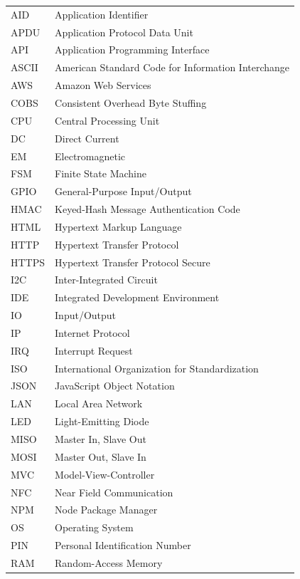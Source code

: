 \documentclass[12pt]{report}
\begin{document}
\begin{longtable}[t]{l@{\hspace*{2cm}}l}
    AID & Application Identifier \\
    APDU & Application Protocol Data Unit \\
    API & Application Programming Interface \\
    ASCII & American Standard Code for Information Interchange \\
    AWS & Amazon Web Services \\
    COBS & Consistent Overhead Byte Stuffing \\
    CPU & Central Processing Unit \\
    DC & Direct Current \\
    EM & Electromagnetic \\
    FSM & Finite State Machine \\
    GPIO & General-Purpose Input/Output \\
    HMAC & Keyed-Hash Message Authentication Code \\
    HTML & Hypertext Markup Language \\
    HTTP & Hypertext Transfer Protocol \\
    HTTPS & Hypertext Transfer Protocol Secure \\
    I2C & Inter-Integrated Circuit \\
    IDE & Integrated Development Environment \\
    IO & Input/Output \\
    IP & Internet Protocol \\
    IRQ & Interrupt Request \\
    ISO & International Organization for Standardization \\
    JSON & JavaScript Object Notation \\
    LAN & Local Area Network \\
    LED & Light-Emitting Diode \\
    MISO & Master In, Slave Out \\
    MOSI & Master Out, Slave In \\
    MVC & Model-View-Controller \\
    NFC & Near Field Communication \\
    NPM & Node Package Manager \\
    OS & Operating System \\
    PIN & Personal Identification Number \\
    RAM & Random-Access Memory \\

\end{longtable}
\end{document}
